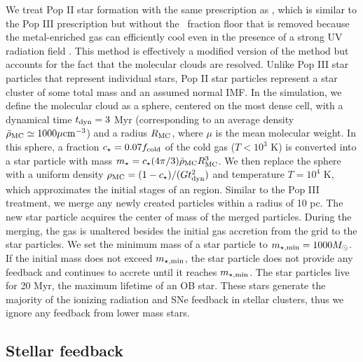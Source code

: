 \documentclass[apjl]{emulateapj}
\begin{document}
%

We treat Pop II star formation with the same prescription as
\citet{Wise09}, which is similar to the Pop III prescription but
without the \hh~fraction floor that is removed because the
metal-enriched gas can efficiently cool even in the presence of a
strong UV radiation field \citep[e.g.][]{Safranek10}.  This method is
effectively a modified version of the \citet{Cen92} method but
accounts for the fact that the molecular clouds are resolved.  Unlike
Pop III star particles that represent individual stars, Pop II star
particles represent a star cluster of some total mass and an assumed
normal IMF.  In the simulation, we define the molecular cloud as a
sphere, centered on the most dense cell, with a dynamical time $t_{\rm
  dyn} = 3$ Myr (corresponding to an average density $\bar{\rho}_{\rm
  MC} \simeq 1000\mu \cubecm$) and a radius $R_{\rm MC}$, where $\mu$
is the mean molecular weight.  In this sphere, a fraction $c_\star =
0.07 f_{\rm cold}$ of the cold gas ($T < 10^3$ K) is converted into a
star particle with mass $m_\star = c_\star (4\pi/3) \bar{\rho}_{\rm
  MC} R_{\rm MC}^3$.  We then replace the sphere with a uniform
density $\rho_{\rm MC} = (1 - c_\star) / (Gt_{\rm dyn}^2)$ and
temperature $T = 10^4$ K, which approximates the initial stages of an
 region.  Similar to the Pop III treatment, we merge any
newly created particles within a radius of 10 pc.  The new star
particle acquires the center of mass of the merged particles.  During
the merging, the gas is unaltered besides the initial gas accretion
from the grid to the star particles.  We set the minimum mass of a
star particle to $m_{\rm \star, min} = 1000 \Ms$.  If the initial mass
does not exceed $m_{\rm \star, min}$, the star particle does not
provide any feedback and continues to accrete until it reaches $m_{\rm
  \star, min}$.  The star particles live for 20 Myr, the maximum
lifetime of an OB star.  These stars generate the majority of the
ionizing radiation and SNe feedback in stellar clusters, thus we
ignore any feedback from lower mass stars.

\subsection{Stellar feedback}
\end{document}
